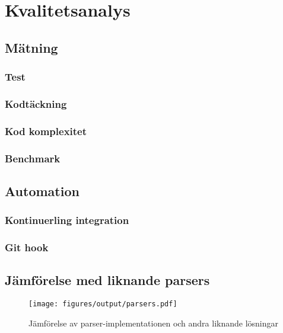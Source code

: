 \section{Kvalitetsanalys}

\subsection{Mätning}

\subsubsection{Test}

\subsubsection{Kodtäckning}

\subsubsection{Kod komplexitet}

\subsubsection{Benchmark}

\subsection{Automation}

\subsubsection{Kontinuerling integration}

\subsubsection{Git hook}

\subsection{Jämförelse med liknande parsers}

\begin{figure}[ht]
  \texttt{[image: figures/output/parsers.pdf]}
  \caption{Jämförelse av parser-implementationen och andra liknande lösningar}
\end{figure}

